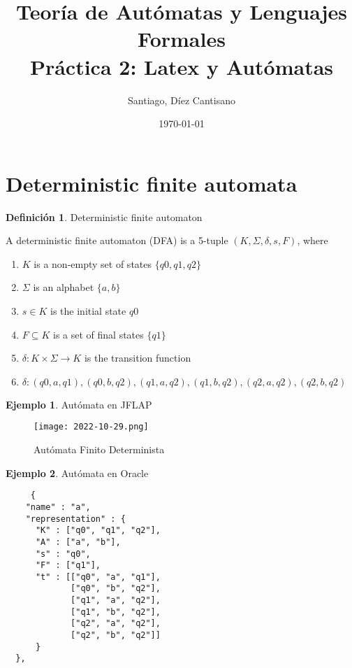 \documentclass[fleqn, 10pt]{article}
\title{Teoría de Autómatas y Lenguajes Formales\\[.4\baselineskip]Práctica 2: Latex y Autómatas}
\author{Santiago, Díez Cantisano}
\date{\today}
\theoremstyle{plain}
\theoremstyle{definition}
\newtheorem{definition}{Definición}[section]
\newtheorem{example}{Ejemplo}[section]
\begin{document}
\maketitle

\section{Deterministic finite automata}

\begin{definition}{Deterministic finite automaton }

A deterministic finite automaton (DFA) is a 5-tuple $(K, \Sigma, \delta,s, F)$, where
\begin{enumerate}[label=]
\item $K$ is a non-empty set of states $\{q0,q1,q2\}$
\item $\Sigma$ is an alphabet $\{a,b\}$
\item $s \in K$ is the initial state $q0$
\item $F \subseteq K$ is a set of final states $\{q1\}$
\item $\delta: K \times \Sigma \to K$ is the transition function 
\item $\delta: (q0, a, q1),(q0, b, q2),(q1, a, q2),(q1, b, q2),(q2, a, q2),(q2, b, q2) $
\end{enumerate}
\end{definition} 

\newpage
\begin{example}
Autómata en JFLAP
\begin{figure}
    \centering
    \texttt{[image: 2022-10-29.png]}
    \caption{Autómata Finito Determinista}
    \label{fig:my_label}
\end{figure}
\end{example}

\begin{example}
Autómata en Oracle

\begin{verbatim}
     {
    "name" : "a",
    "representation" : {
      "K" : ["q0", "q1", "q2"],
      "A" : ["a", "b"],
      "s" : "q0",
      "F" : ["q1"],
      "t" : [["q0", "a", "q1"],
             ["q0", "b", "q2"],
             ["q1", "a", "q2"],
             ["q1", "b", "q2"],
             ["q2", "a", "q2"],
             ["q2", "b", "q2"]]
      }
  },
\end{verbatim}
\end{example}
\end{document}

